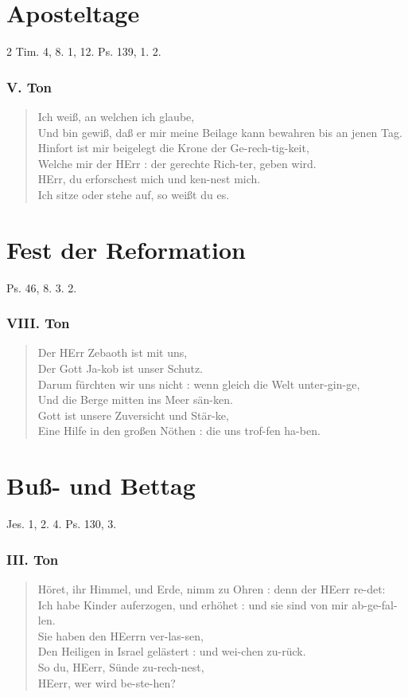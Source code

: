 \section{Aposteltage}

2 Tim. 4, 8. 1, 12. Ps. 139, 1. 2.

\subsubsection{V. Ton}
\begin{verse}
Ich weiß, an welchen ich glaube,\\
Und bin gewiß, daß er mir meine Beilage kann bewahren bis an jenen Tag.\\
Hinfort ist mir beigelegt die Krone der Ge-rech-tig-keit,\\
Welche mir der HErr : der gerechte Rich-ter, geben wird.\\
HErr, du erforschest mich und ken-nest mich.\\
Ich sitze oder stehe auf, so weißt du es.
\end{verse}

\section{Fest der Reformation}

Ps. 46, 8. 3. 2.

\subsubsection{VIII. Ton}
\begin{verse}
Der HErr Zebaoth ist mit uns,\\
Der Gott Ja-kob ist unser Schutz.\\
Darum fürchten wir uns nicht : wenn gleich die Welt unter-gin-ge,\\
Und die Berge mitten ins Meer sän-ken.\\
Gott ist unsere Zuversicht und Stär-ke,\\
Eine Hilfe in den großen Nöthen : die uns trof-fen ha-ben.
\end{verse}

\section{Buß- und Bettag}

Jes. 1, 2. 4. Ps. 130, 3.

\subsubsection{III. Ton}
\begin{verse}
Höret, ihr Himmel, und Erde, nimm zu Ohren : denn der HEerr re-det:\\
Ich habe Kinder auferzogen, und erhöhet : und sie sind von mir ab-ge-fal-len.\\
Sie haben den HEerrn ver-las-sen,\\
Den Heiligen in Israel gelästert : und wei-chen zu-rück.\\
So du, HEerr, Sünde zu-rech-nest,\\
HEerr, wer wird be-ste-hen?
\end{verse}

